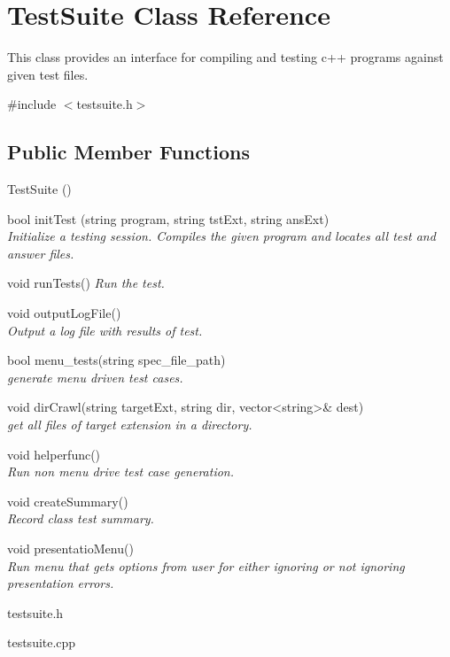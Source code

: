 \hypertarget{class_poly}{\section{Test\-Suite Class Reference}
\label{class_poly}
}


This class provides an interface for compiling and testing c++ programs against given test files.  




{\ttfamily \#include $<$testsuite.\-h$>$}

\subsection*{Public Member Functions}
\begin{DoxyCompactItemize}
\item TestSuite ()
\item bool initTest (string program, string tstExt, string ansExt)\\
\textit{Initialize a testing session. Compiles the given program and locates all test and answer files.}  
\item void runTests()
	\textit{ Run the test.}
\item void outputLogFile() \\
	\textit{ Output a log file with results of test.}
\item bool menu\_tests(string spec\_file\_path) \\
 	\textit{generate menu driven test cases.}
\item void dirCrawl(string targetExt, string dir, vector\textless string\textgreater  \& dest)\\
 	\textit{get all files of target extension in a directory.}
 \item void helperfunc() \\
	 \textit{Run non menu drive test case generation.}
 \item void createSummary() \\
	 \textit{Record class test summary.}
 \item void presentatioMenu() \\
	 \textit{Run menu that gets options from user for either ignoring or not ignoring presentation errors.}
\end{DoxyCompactItemize}

\begin{DoxyCompactItemize}
\item 
testsuite.\-h\item 
testsuite.\-cpp\end{DoxyCompactItemize}
